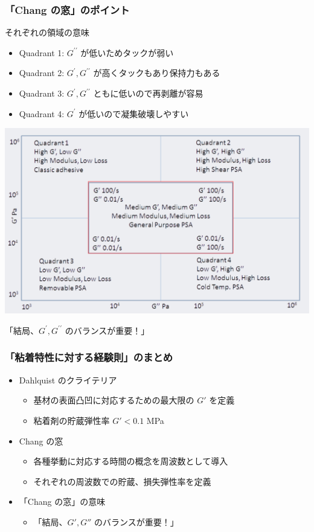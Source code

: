 \documentclass[unicode,12pt]{beamer}%
\begin{document}
\begin{frame}
	\frametitle{「Chang の窓」のポイント}
	\begin{exampleblock}{それぞれの領域の意味}
		\begin{itemize}
			\item Quadrant 1: $G^{\prime \prime}$ が低いためタックが弱い
			\item Quadrant 2: $G^{\prime}, G^{\prime \prime}$ が高くタックもあり保持力もある
			\item Quadrant 3: $G^{\prime}, G^{\prime \prime}$ ともに低いので再剥離が容易
			\item Quadrant 4: $G^{\prime}$ が低いので凝集破壊しやすい
		\end{itemize}

		\vspace{3mm}
		\centering
			\includegraphics[width=.4\textwidth]{ChangFrequencies_2.png}

			\large
			\alert{「結局、$G^{\prime}, G^{\prime \prime}$ のバランスが重要！」}
	\end{exampleblock}	
\end{frame}

\begin{frame}
	\frametitle{「粘着特性に対する経験則」のまとめ}
        \begin{boxnote}
            \vspace{-3mm}
            \begin{itemize}
                \item Dahlquist のクライテリア
                    \begin{itemize}
                        \item 基材の表面凸凹に対応するための最大限の $G'$ を定義
                        \item 粘着剤の貯蔵弾性率 $G' < 0.1$ MPa
                    \end{itemize} 
                \item Chang の窓
                    \begin{itemize}
                        \item 各種挙動に対応する時間の概念を周波数として導入
                        \item それぞれの周波数での貯蔵、損失弾性率を定義
                    \end{itemize} 
                \item 「Chang の窓」の意味
                    \begin{itemize}
                        \item 「結局、$G', G''$ のバランスが重要！」
                    \end{itemize}
            \end{itemize}
        \end{boxnote}
\end{frame}
\end{document}
